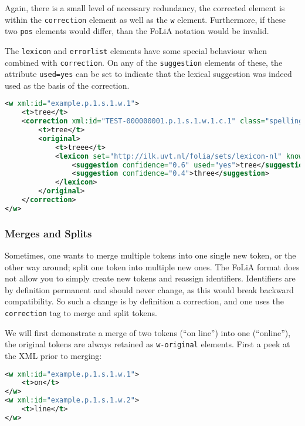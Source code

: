 \documentclass[a4paper,12pt]{report}
\begin{document}
Again, there is a small level of necessary redundancy, the corrected element is within the \texttt{correction} element as well as the \texttt{w} element. Furthermore, if these two \texttt{pos} elements would differ, than the FoLiA notation would be invalid.

The \texttt{lexicon} and \texttt{errorlist} elements have some special behaviour when combined with \texttt{correction}. On any of the \texttt{suggestion} elements of these, the attribute \texttt{used=yes} can be set to indicate that the lexical suggestion was indeed used as the basis of the correction.


\begin{lstlisting}[language=xml]
<w xml:id="example.p.1.s.1.w.1">
    <t>tree</t>
    <correction xml:id="TEST-000000001.p.1.s.1.w.1.c.1" class="spelling">
        <t>tree</t>
        <original>
            <t>treee</t>
            <lexicon set="http://ilk.uvt.nl/folia/sets/lexicon-nl" known="no">
                <suggestion confidence="0.6" used="yes">tree</suggestion>
                <suggestion confidence="0.4">three</suggestion>
            </lexicon>    
        </original>        
    </correction>
</w>
\end{lstlisting}



\subsubsection{Merges and Splits} 

Sometimes, one wants to merge multiple tokens into one single new token, or the other way around; split one token into multiple new ones. The FoLiA format does not allow you to simply create new tokens and reassign identifiers. Identifiers are by definition permanent and should never change, as this would break backward compatibility. So such a change is by definition a correction, and one uses the \texttt{correction} tag to merge and split tokens.

We will first demonstrate a merge of two tokens (``on line'') into one (``online''), the original tokens are always retained as \texttt{w-original} elements. First a peek at the XML prior to merging:

\begin{lstlisting}[language=xml]
<w xml:id="example.p.1.s.1.w.1">
    <t>on</t>
</w>
<w xml:id="example.p.1.s.1.w.2">
    <t>line</t>
</w>                         
\end{lstlisting}
\end{document}
